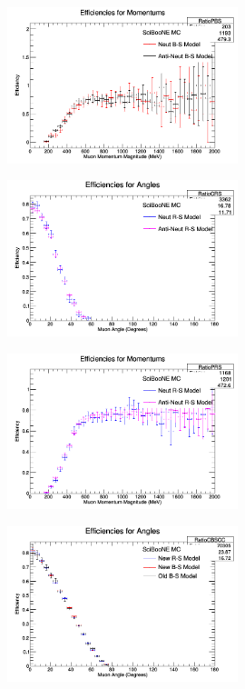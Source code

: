 \documentclass[11pt]{article}
\begin{document}
\begin{figure}[H]
\centering
\includegraphics[width=0.6\textwidth]{NMCombinedPlotsImages/19-NMCombinedPlots.png}
\caption{}
\end{figure}

\begin{figure}[H]
\centering
\includegraphics[width=0.6\textwidth]{NMCombinedPlotsImages/20-NMCombinedPlots.png}
\caption{}
\end{figure}

\begin{figure}[H]
\centering
\includegraphics[width=0.6\textwidth]{NMCombinedPlotsImages/21-NMCombinedPlots.png}
\caption{}
\end{figure}

\begin{figure}[H]
\centering
\includegraphics[width=0.6\textwidth]{NMCombinedPlotsImages/22-NMCombinedPlots.png}
\caption{}
\end{figure}
\end{document}
